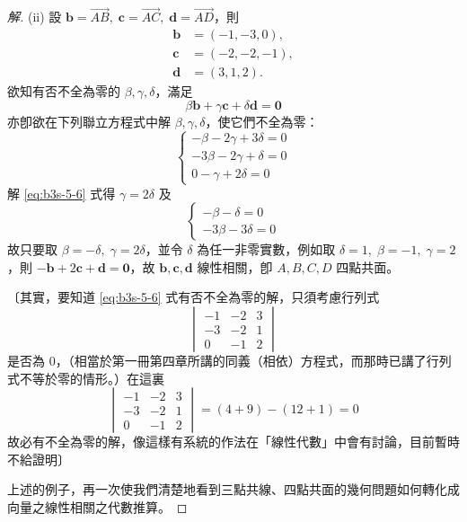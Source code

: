 \begin{proof}[解]
(ii) 設 $\mathbf{b} = \vec{AB},\; \mathbf{c} = \vec{AC},\; \mathbf{d} = \vec{AD}$，則
\begin{align*}
\mathbf{b} &= (-1, -3, 0), \\
\mathbf{c} &= (-2, -2, -1), \\
\mathbf{d} &= (3, 1, 2).
\end{align*}
欲知有否不全為零的 $\beta, \gamma, \delta$，滿足
\begin{equation}
\beta \mathbf{b} + \gamma \mathbf{c} + \delta \mathbf{d} = \mathbf{0} \label{eq:b3s-5-5}
\end{equation}
亦卽欲在下列聯立方程式中解 $\beta, \gamma, \delta$，使它們不全為零：
\begin{equation}
\begin{cases}
-\beta - 2\gamma + 3\delta = 0 \\
-3\beta - 2\gamma + \delta = 0 \\
0 - \gamma + 2\delta = 0
\end{cases} \label{eq:b3s-5-6}
\end{equation}
解 \eqref{eq:b3s-5-6} 式得 $\gamma = 2\delta$ 及
\[ \begin{cases} -\beta - \delta = 0 \\ -3\beta - 3\delta = 0 \end{cases} \]
故只要取 $\beta = -\delta,\; \gamma = 2\delta$，並令 $\delta$ 為任一非零實數，例如取 $\delta = 1,\; \beta = -1,\; \gamma = 2$，則 $-\mathbf{b} + 2\mathbf{c} + \mathbf{d} = \mathbf{0}$，故 $\mathbf{b}, \mathbf{c}, \mathbf{d}$ 線性相關，卽 $A, B, C, D$ 四點共面。

〔其實，要知道 \eqref{eq:b3s-5-6} 式有否不全為零的解，只須考慮行列式
\[ \begin{vmatrix} -1 & -2 & 3 \\ -3 & -2 & 1 \\ 0 & -1 & 2 \end{vmatrix} \]
是否為 0，（相當於第一冊第四章所講的同義（相依）方程式，而那時已講了行列式不等於零的情形。）在這裏
\[ \begin{vmatrix} -1 & -2 & 3 \\ -3 & -2 & 1 \\ 0 & -1 & 2 \end{vmatrix} = (4 + 9) - (12 + 1) = 0 \]
故必有不全為零的解，像這樣有系統的作法在「線性代數」中會有討論，目前暫時不給證明〕

上述的例子，再一次使我們清楚地看到三點共線、四點共面的幾何問題如何轉化成向量之線性相關之代數推算。
\end{proof}

